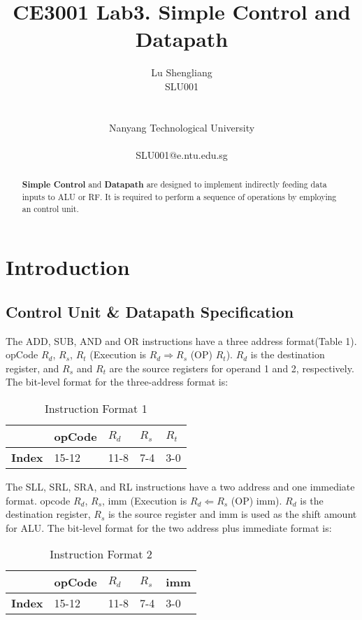 \documentclass[12pt,fleqn]{article}
\title{CE3001 Lab3. Simple Control and Datapath}
\author{
  Lu Shengliang \\
  SLU001\\
  \Organization{} \\
  \vspace*{-10mm} \\
  Nanyang Technological University \\
  \vspace*{-10mm} \\
  SLU001@e.ntu.edu.sg
}
\begin{document}
\maketitle

\begin{abstract}
\textbf{Simple Control} and \textbf{Datapath} are designed to implement indirectly feeding data inputs to ALU or RF. It is required to perform a sequence of operations by employing an control unit.
\end{abstract}



\section{Introduction}

\label{sec:intro}

\subsection{Control Unit \& Datapath Specification} 
The ADD, SUB, AND and OR instructions have a three address format(Table 1).
opCode $R_d$, $R_s$, $R_t$ (Execution is \ensuremath{R_d \Rightarrow R_s} (OP) $R_t$). $R_d$ is the destination register, and $R_s$ and $R_t$ are the source registers for operand 1 and 2, respectively. The bit-level format for the three-address format is:
\begin{table}
  \centering
  \begin{tabularx}{\textwidth}{| X | X | X | X | X |}
    \hline
    \textbf{} & \textbf{opCode} & \textbf{$R_d$} & \textbf{$R_s$} & \textbf{$R_t$}\\ \hline
    \textbf{Index} & 15-12 & 11-8 & 7-4 & 3-0 \\
    \hline
  \end{tabularx}
  \caption{Instruction Format 1}
\end{table}

The SLL, SRL, SRA, and RL instructions have a two address and one immediate format.
opcode $R_d$, $R_s$, imm (Execution is \ensuremath{R_d \Leftarrow R_s} (OP) imm). $R_d$ is the destination register, $R_s$ is the source register and imm is used as the shift amount for ALU. The bit-level format for the two address plus immediate format is:
\begin{table}
  \centering
  \begin{tabularx}{\textwidth}{| X | X | X | X | X |}
    \hline
    \textbf{} & \textbf{opCode} & \textbf{$R_d$} & \textbf{$R_s$} & \textbf{imm}\\ \hline
    \textbf{Index} & 15-12 & 11-8 & 7-4 & 3-0 \\
    \hline
  \end{tabularx}
  \caption{Instruction Format 2}
\end{table}
\end{document}
